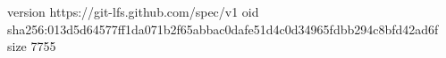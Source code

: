 version https://git-lfs.github.com/spec/v1
oid sha256:013d5d64577ff1da071b2f65abbac0dafe51d4c0d34965fdbb294c8bfd42ad6f
size 7755
